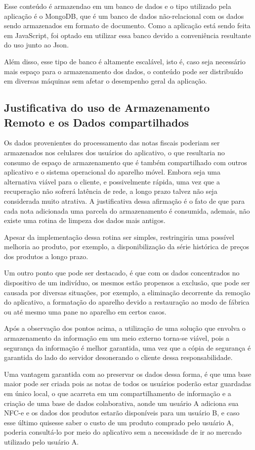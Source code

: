 Esse conteúdo é armazendao em um banco de dados e o tipo utilizado pela aplicação é o MongoDB, que é um banco de dados não-relacional com os dados sendo armazenados em formato de documento. Como a aplicação está sendo feita em JavaScript, foi optado em utilizar essa banco devido a conveniência resultante do uso junto ao Json.

Além disso, esse tipo de banco é altamente escalável, isto é, caso seja necessário mais espaço para o armazenamento dos dados, o conteúdo pode ser distribuído em diversas máquinas sem afetar o desempenho geral da aplicação.

\subsection{Justificativa do uso de Armazenamento Remoto e os Dados compartilhados}

Os dados provenientes do processamento das notas fiscais poderiam ser armazenados nos celulares dos usuários do aplicativo, o que resultaria no consumo de espaço de armazenamento que é também compartilhado com outros aplicativo e o sistema operacional do aparelho móvel. Embora seja uma alternativa viável para o cliente, e possivelmente rápida, uma vez que a recuperação não sofrerá latência de rede, a longo prazo talvez não seja considerada muito atrativa. A justificativa dessa afirmação é o fato de que para cada nota adicionada uma parcela do armazenamento é consumida, ademais, não existe uma rotina de limpeza dos dados mais antigos.

Apesar da implementação dessa rotina ser simples, restringiria uma possível melhoria ao produto, por exemplo, a disponibilização da série histórica de preços dos produtos a longo prazo.

Um outro ponto que pode ser destacado, é que com os dados concentrados no dispositivo de um indivíduo, os mesmos estão propensos a exclusão, que pode ser causada por diversas situações, por exemplo, a eliminação decorrente da remoção do aplicativo, a formatação do aparelho devido a restauração ao modo de fábrica ou até mesmo uma pane no aparelho em certos casos.

Após a observação dos pontos acima, a utilização de uma solução que envolva o armazenamento da informação em um meio externo torna-se viável, pois a segurança da informação é melhor garantida, uma vez que a cópia de segurança é garantida do lado do servidor desonerando o cliente dessa responsabilidade.

Uma vantagem garantida com ao preservar os dados dessa forma, é que uma base maior pode ser criada pois as notas de todos os usuários poderão estar guardadas em único local, o que acarreta em um compartilhamento de informação e a criação de uma base de dados colaborativa, aonde um usuário A adiciona sua NFC-e e os dados dos produtos estarão disponíveis para um usuário B, e caso esse último quisesse saber o custo de um produto comprado pelo usuário A, poderia consultá-lo por meio do aplicativo sem a necessidade de ir ao mercado utilizado pelo usuário A.

